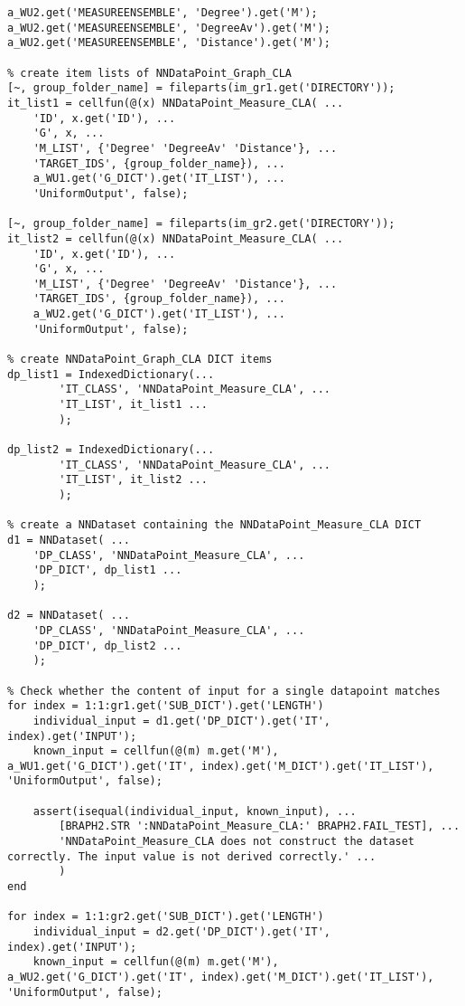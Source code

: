 \documentclass{tufte-handout}
\begin{document}
\begin{lstlisting}
a_WU2.get('MEASUREENSEMBLE', 'Degree').get('M');
a_WU2.get('MEASUREENSEMBLE', 'DegreeAv').get('M');
a_WU2.get('MEASUREENSEMBLE', 'Distance').get('M');

% create item lists of NNDataPoint_Graph_CLA
[~, group_folder_name] = fileparts(im_gr1.get('DIRECTORY'));
it_list1 = cellfun(@(x) NNDataPoint_Measure_CLA( ...
    'ID', x.get('ID'), ...
    'G', x, ...
    'M_LIST', {'Degree' 'DegreeAv' 'Distance'}, ...
    'TARGET_IDS', {group_folder_name}), ...
    a_WU1.get('G_DICT').get('IT_LIST'), ...
    'UniformOutput', false);

[~, group_folder_name] = fileparts(im_gr2.get('DIRECTORY'));
it_list2 = cellfun(@(x) NNDataPoint_Measure_CLA( ...
    'ID', x.get('ID'), ...
    'G', x, ...
    'M_LIST', {'Degree' 'DegreeAv' 'Distance'}, ...
    'TARGET_IDS', {group_folder_name}), ...
    a_WU2.get('G_DICT').get('IT_LIST'), ...
    'UniformOutput', false);

% create NNDataPoint_Graph_CLA DICT items
dp_list1 = IndexedDictionary(...
        'IT_CLASS', 'NNDataPoint_Measure_CLA', ...
        'IT_LIST', it_list1 ...
        );

dp_list2 = IndexedDictionary(...
        'IT_CLASS', 'NNDataPoint_Measure_CLA', ...
        'IT_LIST', it_list2 ...
        );

% create a NNDataset containing the NNDataPoint_Measure_CLA DICT
d1 = NNDataset( ...
    'DP_CLASS', 'NNDataPoint_Measure_CLA', ...
    'DP_DICT', dp_list1 ...
    );

d2 = NNDataset( ...
    'DP_CLASS', 'NNDataPoint_Measure_CLA', ...
    'DP_DICT', dp_list2 ...
    );

% Check whether the content of input for a single datapoint matches
for index = 1:1:gr1.get('SUB_DICT').get('LENGTH')
    individual_input = d1.get('DP_DICT').get('IT', index).get('INPUT');
    known_input = cellfun(@(m) m.get('M'), a_WU1.get('G_DICT').get('IT', index).get('M_DICT').get('IT_LIST'), 'UniformOutput', false);

    assert(isequal(individual_input, known_input), ...
        [BRAPH2.STR ':NNDataPoint_Measure_CLA:' BRAPH2.FAIL_TEST], ...
        'NNDataPoint_Measure_CLA does not construct the dataset correctly. The input value is not derived correctly.' ...
        )
end

for index = 1:1:gr2.get('SUB_DICT').get('LENGTH')
    individual_input = d2.get('DP_DICT').get('IT', index).get('INPUT');
    known_input = cellfun(@(m) m.get('M'), a_WU2.get('G_DICT').get('IT', index).get('M_DICT').get('IT_LIST'), 'UniformOutput', false);


\end{lstlisting}
\end{document}
